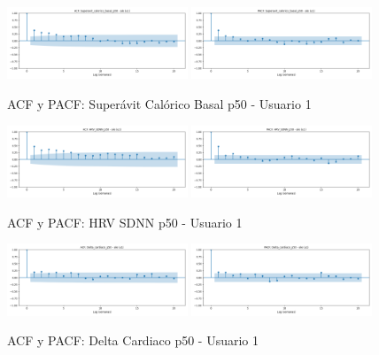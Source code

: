 \documentclass[12pt,letterpaper,twoside]{report}
\begin{document}
\begin{figure}[H]
\centering
\includegraphics[width=0.48\textwidth]{figuras/acf_Superavit_calorico_basal_p50_u1.png}
\includegraphics[width=0.48\textwidth]{figuras/pacf_Superavit_calorico_basal_p50_u1.png}
\caption{ACF y PACF: Superávit Calórico Basal p50 - Usuario 1}
\end{figure}

\begin{figure}[H]
\centering
\includegraphics[width=0.48\textwidth]{figuras/acf_HRV_SDNN_p50_u1.png}
\includegraphics[width=0.48\textwidth]{figuras/pacf_HRV_SDNN_p50_u1.png}
\caption{ACF y PACF: HRV SDNN p50 - Usuario 1}
\end{figure}

\begin{figure}[H]
\centering
\includegraphics[width=0.48\textwidth]{figuras/acf_Delta_cardiaco_p50_u1.png}
\includegraphics[width=0.48\textwidth]{figuras/pacf_Delta_cardiaco_p50_u1.png}
\caption{ACF y PACF: Delta Cardiaco p50 - Usuario 1}
\end{figure}
\end{document}
